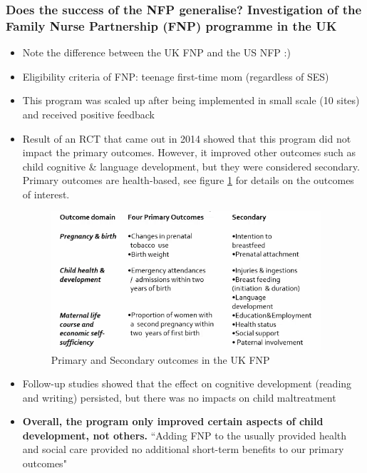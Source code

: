 \subsubsection{Does the success of the NFP generalise? Investigation of the Family Nurse Partnership (FNP) programme in the UK}
\begin{itemize}
    \item Note the difference between the UK FNP and the US NFP :)
    \item Eligibility criteria of FNP: teenage first-time mom (regardless of SES)
    \item This program was scaled up after being implemented in small scale (10 sites) and received positive feedback
    \item Result of an RCT that came out in 2014 showed that this program did not impact the primary outcomes. However, it improved other outcomes such as child cognitive \& language development, but they were considered secondary. Primary outcomes are health-based, see figure \ref{FNPgoal} for details on the outcomes of interest.
    \begin{figure}[H]%
    \centering
    \includegraphics[width=10cm]{images/ch4/OutcomesInterest_FNP.png}
    \caption{Primary and Secondary outcomes in the UK FNP}
    \label{FNPgoal}
    \end{figure}
    \item Follow-up studies showed that the effect on cognitive development (reading and writing) persisted, but there was no impacts on child maltreatment
    \item \textbf{Overall, the program only improved certain aspects of child development, not others.} ``Adding FNP to the usually provided health and social care provided no additional short-term benefits to our primary outcomes"
\end{itemize}

